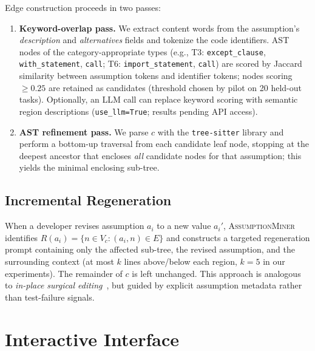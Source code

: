 \documentclass[sigconf,review,anonymous]{acmart}
\newcommand{\sysname}{\textsc{AssumptionMiner}\xspace}
\newcommand{\code}[1]{\texttt{#1}}
\begin{document}
Edge construction proceeds in two passes:
\begin{enumerate}[noitemsep]
  \item \textbf{Keyword-overlap pass.}  We extract content words from the
        assumption's \emph{description} and \emph{alternatives} fields and
        tokenize the code identifiers.  AST nodes of the category-appropriate
        types (e.g., T3: \texttt{except\_clause}, \texttt{with\_statement},
        \texttt{call}; T6: \texttt{import\_statement}, \texttt{call}) are
        scored by Jaccard similarity between
        assumption tokens and identifier tokens; nodes scoring $\geq 0.25$
        are retained as candidates (threshold chosen by pilot on 20 held-out tasks).
        Optionally, an LLM call can replace keyword scoring with semantic
        region descriptions (\texttt{use\_llm=True}; results pending API access).
  \item \textbf{AST refinement pass.}  We parse $c$ with the \code{tree-sitter}
        library and perform a bottom-up traversal from each candidate leaf node,
        stopping at the deepest ancestor that encloses \emph{all} candidate
        nodes for that assumption; this yields the minimal enclosing sub-tree.
\end{enumerate}

\subsection{Incremental Regeneration}
\label{sec:regeneration}

When a developer revises assumption $a_i$ to a new value $a_i'$, \sysname
identifies $R(a_i) = \{n \in V_c : (a_i, n) \in E\}$ and constructs a targeted
regeneration prompt containing only the affected sub-tree, the revised assumption,
and the surrounding context (at most $k$ lines above/below each region,
$k = 5$ in our experiments).
The remainder of $c$ is left unchanged.  This approach is analogous to
\emph{in-place surgical editing}~\cite{xia2023chatrepair}, but guided by explicit
assumption metadata rather than test-failure signals.

\section{Interactive Interface}
\label{sec:interface}
\end{document}
